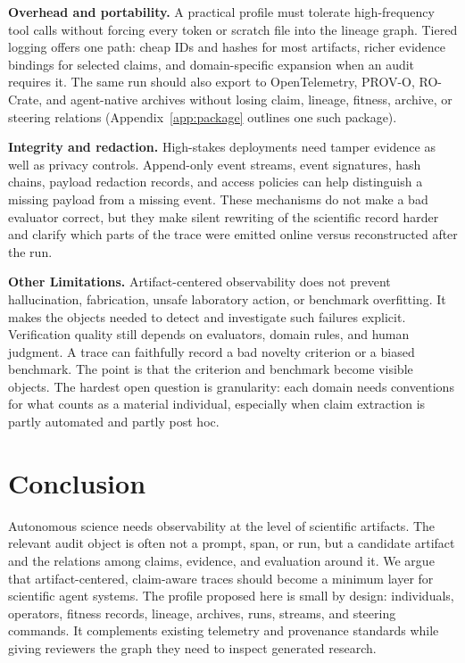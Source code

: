\documentclass{article}
\begin{document}
\textbf{Overhead and portability.} A practical profile must tolerate high-frequency tool calls without forcing every token or scratch file into the lineage graph. Tiered logging offers one path: cheap IDs and hashes for most artifacts, richer evidence bindings for selected claims, and domain-specific expansion when an audit requires it. The same run should also export to OpenTelemetry, PROV-O, RO-Crate, and agent-native archives without losing claim, lineage, fitness, archive, or steering relations (Appendix~\ref{app:package} outlines one such package).

\textbf{Integrity and redaction.} High-stakes deployments need tamper evidence as well as privacy controls. Append-only event streams, event signatures, hash chains, payload redaction records, and access policies can help distinguish a missing payload from a missing event. These mechanisms do not make a bad evaluator correct, but they make silent rewriting of the scientific record harder and clarify which parts of the trace were emitted online versus reconstructed after the run.

\textbf{Other Limitations.} Artifact-centered observability does not prevent hallucination, fabrication, unsafe laboratory action, or benchmark overfitting. It makes the objects needed to detect and investigate such failures explicit. Verification quality still depends on evaluators, domain rules, and human judgment. A trace can faithfully record a bad novelty criterion or a biased benchmark. The point is that the criterion and benchmark become visible objects. The hardest open question is granularity: each domain needs conventions for what counts as a material individual, especially when claim extraction is partly automated and partly post hoc.

\section{Conclusion}

Autonomous science needs observability at the level of scientific artifacts. The relevant audit object is often not a prompt, span, or run, but a candidate artifact and the relations among claims, evidence, and evaluation around it. We argue that artifact-centered, claim-aware traces should become a minimum layer for scientific agent systems. The profile proposed here is small by design: individuals, operators, fitness records, lineage, archives, runs, streams, and steering commands. It complements existing telemetry and provenance standards while giving reviewers the graph they need to inspect generated research. 
\end{document}
